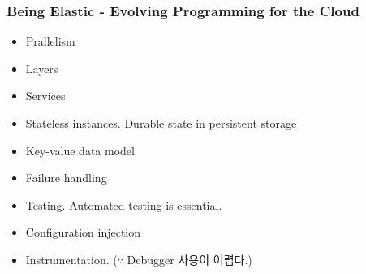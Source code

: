 \begin{frame}
\frametitle{Being Elastic - Evolving Programming for the Cloud}

\begin{itemize}
\item Prallelism
\item Layers
\item Services
\item Stateless instances. Durable state in persistent storage
\item Key-value data model
\item Failure handling
\item Testing. Automated testing is essential.
\item Configuration injection
\item Instrumentation. ($\because$ Debugger 사용이 어렵다.)
\end{itemize}


\end{frame}
